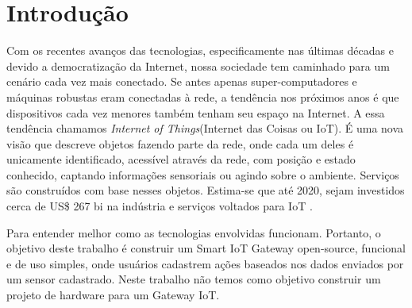 \section*{Introdução}
\label{sec:intro}

Com os recentes avanços das tecnologias, especificamente nas últimas décadas e devido a democratização da Internet, nossa sociedade tem caminhado para um cenário cada vez mais conectado. Se antes apenas super-computadores e máquinas robustas eram conectadas à rede, a tendência nos próximos anos é que dispositivos cada vez menores também tenham seu espaço na Internet.
A essa tendência chamamos \textit{Internet of Things}(Internet das Coisas ou IoT). É uma nova visão que descreve objetos fazendo parte da rede, onde cada um deles é unicamente identificado, acessível através da rede, com posição e estado conhecido, captando informações sensoriais ou agindo sobre o ambiente. Serviços são construídos com base nesses objetos. Estima-se que até 2020, sejam investidos cerca de US\$ 267 bi na indústria e serviços voltados para IoT \cite{BCGPerspectives,Forbes}.

Para entender melhor como as tecnologias envolvidas funcionam. Portanto, o objetivo deste trabalho é construir um Smart IoT Gateway open-source, funcional e de uso simples, onde usuários cadastrem ações baseados nos dados enviados por um sensor cadastrado. Neste trabalho não temos como objetivo construir um projeto de hardware para um Gateway IoT.
